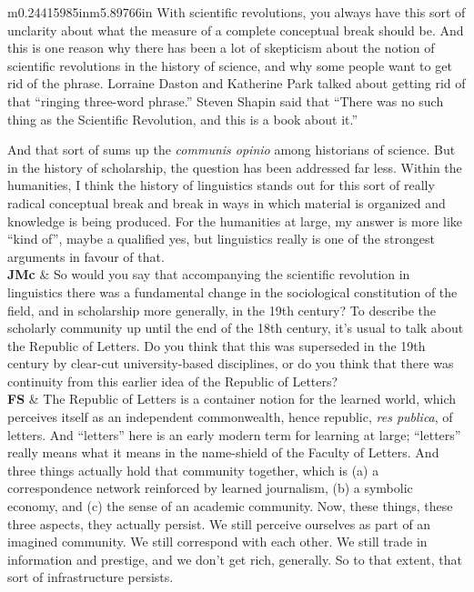 \documentclass[12pt]{article}
\begin{document}
\begin{flushleft}
\begin{supertabular}{m{0.24415985in}m{5.89766in}}
With scientific revolutions, you always have this sort of unclarity about what the measure of a complete conceptual break should be. And this is one reason why there has been a lot of skepticism about the notion of scientific revolutions in the history of science, and why some people want to get rid of the phrase. Lorraine Daston and Katherine Park talked about getting rid of that “ringing three-word phrase.” Steven Shapin said that “There was no such thing as the Scientific Revolution, and this is a book about it.” 

And that sort of sums up the \textit{communis opinio} among historians of science. But in the history of scholarship, the question has been addressed far less. Within the humanities, I think the history of linguistics stands out for this sort of really radical conceptual break and break in ways in which material is organized and knowledge is being produced. For the humanities at large, my answer is more like “kind of”, maybe a qualified yes, but linguistics really is one of the strongest arguments in favour of that.\\
\textbf{JMc}\newline
 &
So would you say that accompanying the scientific revolution in linguistics there was a fundamental change in the sociological constitution of the field, and in scholarship more generally, in the 19th century? To describe the scholarly community up until the end of the 18th century, it’s usual to talk about the Republic of Letters. Do you think that this was superseded in the 19th century by clear-cut university-based disciplines, or do you think that there was continuity from this earlier idea of the Republic of Letters?\\
\textbf{FS}\newline
 &
The Republic of Letters is a container notion for the learned world, which perceives itself as an independent commonwealth, hence republic, \textit{res publica}, of letters. And “letters” here is an early modern term for learning at large; “letters” really means what it means in the name-shield of the Faculty of Letters. And three things actually hold that community together, which is (a) a correspondence network reinforced by learned journalism, (b) a symbolic economy, and (c) the sense of an academic community. Now, these things, these three aspects, they actually persist. We still perceive ourselves as part of an imagined community. We still correspond with each other. We still trade in information and prestige, and we don’t get rich, generally. So to that extent, that sort of infrastructure persists. 


\end{supertabular}
\end{flushleft}
\end{document}
